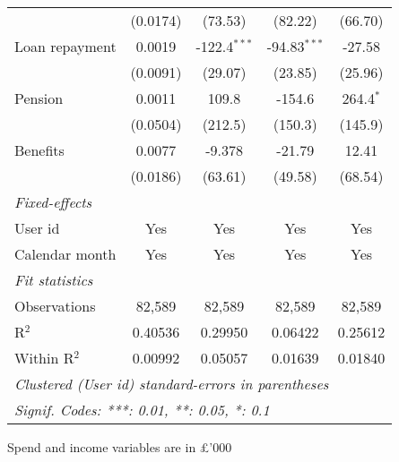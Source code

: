 \begin{table}[htbp]
\begin{threeparttable}[b]
\begin{tabular}{lcccc}
                                  & (0.0174)           & (73.53)        & (82.22)        & (66.70)\\   
         Loan repayment           & 0.0019             & -122.4$^{***}$ & -94.83$^{***}$ & -27.58\\   
                                  & (0.0091)           & (29.07)        & (23.85)        & (25.96)\\   
         Pension                  & 0.0011             & 109.8          & -154.6         & 264.4$^{*}$\\   
                                  & (0.0504)           & (212.5)        & (150.3)        & (145.9)\\   
         Benefits                 & 0.0077             & -9.378         & -21.79         & 12.41\\   
                                  & (0.0186)           & (63.61)        & (49.58)        & (68.54)\\   
         \midrule
         \emph{Fixed-effects}\\
         User id                  & Yes                & Yes            & Yes            & Yes\\  
         Calendar month           & Yes                & Yes            & Yes            & Yes\\  
         \midrule
         \emph{Fit statistics}\\
         Observations             & 82,589             & 82,589         & 82,589         & 82,589\\  
         R$^2$                    & 0.40536            & 0.29950        & 0.06422        & 0.25612\\  
         Within R$^2$             & 0.00992            & 0.05057        & 0.01639        & 0.01840\\  
         \midrule \midrule
         \multicolumn{5}{l}{\emph{Clustered (User id) standard-errors in parentheses}}\\
         \multicolumn{5}{l}{\emph{Signif. Codes: ***: 0.01, **: 0.05, *: 0.1}}\\
      \end{tabular}
      
      \begin{tablenotes}\footnotesize
         \item Spend and income variables are in \pounds'000
      \end{tablenotes}
   \end{threeparttable}
\end{table}


